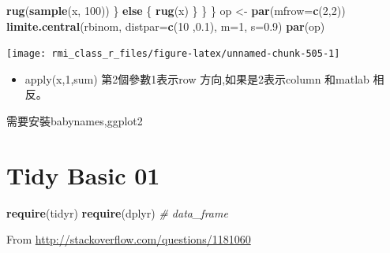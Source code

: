 \documentclass[]{book}
\newenvironment{Shaded}{\begin{snugshade}}{\end{snugshade}}
\newcommand{\CommentTok}[1]{\textcolor[rgb]{0.56,0.35,0.01}{\textit{#1}}}
\newcommand{\ControlFlowTok}[1]{\textcolor[rgb]{0.13,0.29,0.53}{\textbf{#1}}}
\newcommand{\DataTypeTok}[1]{\textcolor[rgb]{0.13,0.29,0.53}{#1}}
\newcommand{\DecValTok}[1]{\textcolor[rgb]{0.00,0.00,0.81}{#1}}
\newcommand{\FloatTok}[1]{\textcolor[rgb]{0.00,0.00,0.81}{#1}}
\newcommand{\KeywordTok}[1]{\textcolor[rgb]{0.13,0.29,0.53}{\textbf{#1}}}
\newcommand{\NormalTok}[1]{#1}
\newcommand{\StringTok}[1]{\textcolor[rgb]{0.31,0.60,0.02}{#1}}
\providecommand{\tightlist}{%
  \setlength{\itemsep}{0pt}\setlength{\parskip}{0pt}}
\theoremstyle{definition}
\theoremstyle{definition}
\theoremstyle{definition}
\theoremstyle{remark}
\begin{document}
\begin{Shaded}
\begin{Highlighting}[]
        \KeywordTok{rug}\NormalTok{(}\KeywordTok{sample}\NormalTok{(x, }\DecValTok{100}\NormalTok{))}
\NormalTok{      \} }\ControlFlowTok{else}\NormalTok{ \{}
        \KeywordTok{rug}\NormalTok{(x)}
\NormalTok{      \}}
\NormalTok{    \}}
\NormalTok{  \}}
\NormalTok{op <-}\StringTok{ }\KeywordTok{par}\NormalTok{(}\DataTypeTok{mfrow=}\KeywordTok{c}\NormalTok{(}\DecValTok{2}\NormalTok{,}\DecValTok{2}\NormalTok{))}
\KeywordTok{limite.central}\NormalTok{(rbinom, }\DataTypeTok{distpar=}\KeywordTok{c}\NormalTok{(}\DecValTok{10}\NormalTok{ ,}\FloatTok{0.1}\NormalTok{), }\DataTypeTok{m=}\DecValTok{1}\NormalTok{, }\DataTypeTok{s=}\FloatTok{0.9}\NormalTok{)}
\KeywordTok{par}\NormalTok{(op)}
\end{Highlighting}
\end{Shaded}

\begin{center}\texttt{[image: rmi\_class\_r\_files/figure-latex/unnamed-chunk-505-1]} \end{center}

\begin{itemize}
\tightlist
\item
  apply(x,1,sum) 第2個參數1表示row 方向,如果是2表示column 和matlab
  相反。
\end{itemize}

\begin{Shaded}
\begin{Highlighting}[]
\NormalTok{需要安裝babynames,ggplot2}
\end{Highlighting}
\end{Shaded}

\hypertarget{tidy-basic-01}{%
\chapter{Tidy Basic 01}\label{tidy-basic-01}}

\begin{Shaded}
\begin{Highlighting}[]
\KeywordTok{require}\NormalTok{(tidyr)}
\KeywordTok{require}\NormalTok{(dplyr) }\CommentTok{# data_frame}
\end{Highlighting}
\end{Shaded}

From \url{http://stackoverflow.com/questions/1181060}
\end{document}
